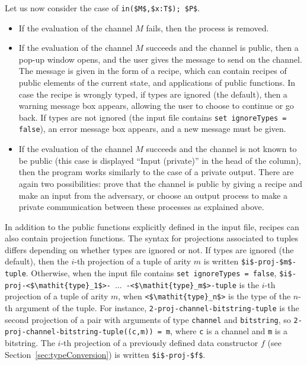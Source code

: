 \documentclass{book}
\begin{document}
Let us now consider the case of \lstinline!in($M$,$x:T$); $P$!.
\begin{itemize}
\item If the evaluation of the channel $M$ fails, then the process is removed.

\item If the evaluation of the channel $M$ succeeds and the channel is public, then a pop-up window opens, and the user gives the message to send on the channel.
The message is given in the form of a recipe, which can contain recipes of public elements of the current state, and applications of public functions.
 In case the recipe is wrongly typed, if types are ignored (the default), then a warning message box appears, allowing the user to choose to continue or go back. If types are not ignored (the input file contains \lstinline!set ignoreTypes = false!), an error message box appears, and a new message must be given.

\item If the evaluation of the channel $M$ succeeds and the channel is not known to be public (this case is displayed ``Input (private)'' in the head of the column), then the program works similarly to the case of a private output. There are again two possibilities: prove that the channel is public by giving a recipe and make an input from the adversary, or choose an output process to make a private communication between these processes as explained above.

\end{itemize}
In addition to the public functions explicitly defined in the input file, recipes can also contain projection functions.
 The syntax for projections associated to tuples differs depending on whether types are ignored or not. If types are ignored (the default), then the $i$-th projection of a tuple of arity $m$ is written \lstinline!$i$-proj-$m$-tuple!. Otherwise, when the input file contains \lstinline!set ignoreTypes = false!, \lstinline!$i$-proj-<$\mathit{type}_1$>-!~$\ldots$~\lstinline!-<$\mathit{type}_m$>-tuple! is the $i$-th projection of a tuple of arity $m$, when \lstinline!<$\mathit{type}_n$>! is the type of the $n$-th argument of the tuple. For instance, \lstinline!2-proj-channel-bitstring-tuple! is the second projection of a pair with arguments of type \lstinline!channel! and \lstinline!bitstring!, so \lstinline!2-proj-channel-bitstring-tuple((c,!\allowbreak\lstinline!m)) = m!, where \lstinline!c! is a channel and \lstinline!m! is a bitstring.
The $i$-th projection of a previously defined data constructor $f$ (see Section~\ref{sec:typeConversion}) is written \lstinline!$i$-proj-$f$!.
\end{document}
